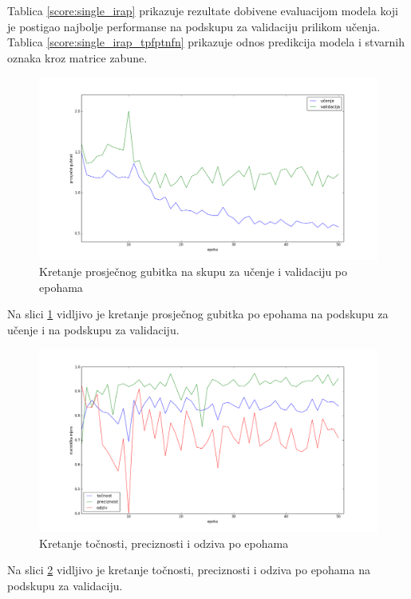 \documentclass[times, utf8, diplomski, numeric]{fer}
\begin{document}
\noindent Tablica \ref{score:single_irap} prikazuje rezultate dobivene evaluacijom modela koji je postigao najbolje performanse na podskupu za validaciju prilikom učenja.
Tablica \ref{score:single_irap_tpfptnfn} prikazuje odnos predikcija modela i stvarnih oznaka kroz matrice zabune.

\begin{figure}[H]
\centering
\includegraphics[scale=0.35]{images/single_irap_loss.png}
\caption{Kretanje prosječnog gubitka na skupu za učenje i validaciju po epohama}
\label{img:single_irap_loss}
\end{figure}
\noindent Na slici \ref{img:single_irap_loss} vidljivo je kretanje prosječnog gubitka po epohama na podskupu za učenje i na podskupu za validaciju.

\begin{figure}[H]
\centering
\includegraphics[scale=0.35]{images/single_irap_ac_ap.png}
\caption{Kretanje točnosti, preciznosti i odziva po epohama}
\label{img:single_irap_ac_ap}
\end{figure}
\noindent Na slici \ref{img:single_irap_ac_ap} vidljivo je kretanje točnosti, preciznosti i odziva po epohama na podskupu za validaciju.
\end{document}
